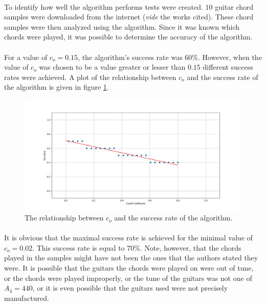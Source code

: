 \documentclass{article}
\begin{document}
\paragraph*{}
To identify how well the algorithm performs tests were created. $10$ guitar 
chord samples were downloaded from the internet (\textit{vide} the works 
cited). These chord samples were then analyzed using the algorithm. Since it 
was known which chords were played, it was possible to determine the accuracy 
of the algorithm.

\paragraph*{}
For a value of $c_o = 0.15$, the algorithm's success rate was $60\%$. However, 
when the value of $c_o$ was chosen to be a value greater or lesser than $0.15$ 
different success rates were achieved. A plot of the relationship between 
$c_o$ and the success rate of the algorithm is given in figure 
\ref{fig:success-rate}.
\begin{figure}[ht]
	\centering
	\includegraphics[width=\textwidth]{img/success-rate}
	\caption{The relationship between $c_o$ and the success rate of the 
	algorithm.}
	\label{fig:success-rate}
\end{figure}

\paragraph*{}
It is obvious that the maximal success rate is achieved for the minimal value 
of $c_o = 0.02$. This success rate is equal to $70\%$. Note, however, that 
the chords played in the samples might have not been the ones that the authors 
stated they were. It is possible that the guitars the chords were played on 
were out of tune, or the chords were played improperly, or the tune of the 
guitars was not one of $A_4 = 440$, or it is even possible that the guitars 
used were not precisely manufactured.
\end{document}
